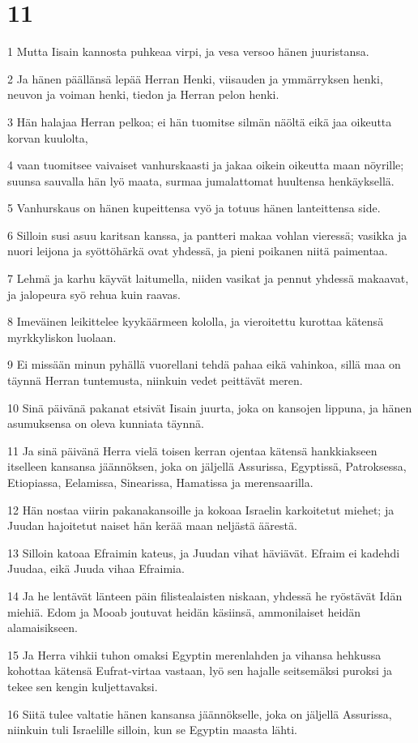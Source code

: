 \chapter{11}

\par 1 Mutta Iisain kannosta puhkeaa virpi, ja vesa versoo hänen juuristansa.
\par 2 Ja hänen päällänsä lepää Herran Henki, viisauden ja ymmärryksen henki, neuvon ja voiman henki, tiedon ja Herran pelon henki.
\par 3 Hän halajaa Herran pelkoa; ei hän tuomitse silmän näöltä eikä jaa oikeutta korvan kuulolta,
\par 4 vaan tuomitsee vaivaiset vanhurskaasti ja jakaa oikein oikeutta maan nöyrille; suunsa sauvalla hän lyö maata, surmaa jumalattomat huultensa henkäyksellä.
\par 5 Vanhurskaus on hänen kupeittensa vyö ja totuus hänen lanteittensa side.
\par 6 Silloin susi asuu karitsan kanssa, ja pantteri makaa vohlan vieressä; vasikka ja nuori leijona ja syöttöhärkä ovat yhdessä, ja pieni poikanen niitä paimentaa.
\par 7 Lehmä ja karhu käyvät laitumella, niiden vasikat ja pennut yhdessä makaavat, ja jalopeura syö rehua kuin raavas.
\par 8 Imeväinen leikittelee kyykäärmeen kololla, ja vieroitettu kurottaa kätensä myrkkyliskon luolaan.
\par 9 Ei missään minun pyhällä vuorellani tehdä pahaa eikä vahinkoa, sillä maa on täynnä Herran tuntemusta, niinkuin vedet peittävät meren.
\par 10 Sinä päivänä pakanat etsivät Iisain juurta, joka on kansojen lippuna, ja hänen asumuksensa on oleva kunniata täynnä.
\par 11 Ja sinä päivänä Herra vielä toisen kerran ojentaa kätensä hankkiakseen itselleen kansansa jäännöksen, joka on jäljellä Assurissa, Egyptissä, Patroksessa, Etiopiassa, Eelamissa, Sinearissa, Hamatissa ja merensaarilla.
\par 12 Hän nostaa viirin pakanakansoille ja kokoaa Israelin karkoitetut miehet; ja Juudan hajoitetut naiset hän kerää maan neljästä äärestä.
\par 13 Silloin katoaa Efraimin kateus, ja Juudan vihat häviävät. Efraim ei kadehdi Juudaa, eikä Juuda vihaa Efraimia.
\par 14 Ja he lentävät länteen päin filistealaisten niskaan, yhdessä he ryöstävät Idän miehiä. Edom ja Mooab joutuvat heidän käsiinsä, ammonilaiset heidän alamaisikseen.
\par 15 Ja Herra vihkii tuhon omaksi Egyptin merenlahden ja vihansa hehkussa kohottaa kätensä Eufrat-virtaa vastaan, lyö sen hajalle seitsemäksi puroksi ja tekee sen kengin kuljettavaksi.
\par 16 Siitä tulee valtatie hänen kansansa jäännökselle, joka on jäljellä Assurissa, niinkuin tuli Israelille silloin, kun se Egyptin maasta lähti.

